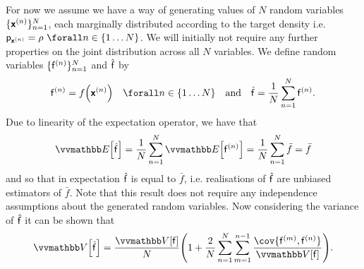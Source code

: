 For now we assume we have a way of generating values of $N$ random variables $\lbrace \boldsymbol{\mathsf{x}}^{(n)}\rbrace_{n=1}^N$, each marginally distributed according to the target density i.e. $\pden{\rvct{x}^{(n)}} = \rho ~\forall n \in \fset{1 \dots N}$. We will initially not require any further properties on the joint distribution across all $N$ variables. We define random variables  $\lbrace \mathsf{f}^{(n)} \rbrace_{n=1}^N$ and $\hat{\mathsf{f}}$ by
\begin{equation}
  \rvar{f}^{(n)} = f\lpa\rvct{x}^{(n)}\rpa \quad\forall n \in \fset{1\dots N}
  \quad\textrm{and}\quad
  \skew{2}{\hat}{\rvar{f}} = \frac{1}{N} \sum_{n=1}^N \rvar{f}^{(n)}.
\end{equation}
Due to linearity of the expectation operator, we have that
\begin{equation}
  \expc{\skew{2}{\hat}{\rvar{f}}} = 
  \frac{1}{N} \sum_{n=1}^N \expc{\rvar{f}^{(n)}} = 
  \frac{1}{N} \sum_{n=1}^N \bar{f} = 
  \bar{f}
\end{equation}
and so that in expectation $\skew{2}{\hat}{\rvar{f}}$ is equal to $\bar{f}$, i.e. realisations of $\skew{2}{\hat}{\rvar{f}}$ are unbiased estimators of $\bar{f}$. Note that this result does not require any independence assumptions about the generated random variables. Now considering the variance of $\skew{2}{\hat}{\rvar{f}}$ it can be shown that
\begin{align}\label{eq:monte-carlo-variance-general}
  \var{\skew{2}{\hat}{\rvar{f}}}
  =
  \frac{\var{\rvar{f}}}{N}
  \lpa 
    1 +\frac{2}{N}\sum_{n=1}^N \sum_{m=1}^{n-1} \frac{\cov{\rvar{f}^{(m)}, \rvar{f}^{(n)}}}{\var{\rvar{f}}}
  \rpa.
\end{align}
